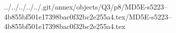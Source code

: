 ../../../../../.git/annex/objects/Q3/p8/MD5E-s5223--4b855bf501e17398bac0f32bc2e255a4.tex/MD5E-s5223--4b855bf501e17398bac0f32bc2e255a4.tex